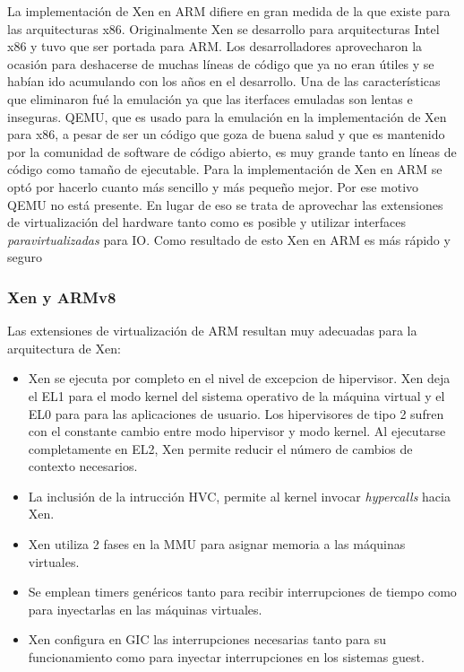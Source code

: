 La implementación de Xen en ARM difiere en gran medida de la que existe para las arquitecturas x86. Originalmente Xen se desarrollo para arquitecturas Intel x86 y tuvo que ser portada para ARM. Los desarrolladores aprovecharon la ocasión para deshacerse de muchas líneas de código que ya no eran útiles y se habían ido acumulando con los años en el desarrollo. Una de las características que eliminaron fué la emulación ya que las iterfaces emuladas son lentas e inseguras. QEMU, que es usado para la emulación en la implementación de Xen para x86, a pesar de ser un código que goza de buena salud y que es mantenido por la comunidad de software de código abierto, es muy grande tanto en líneas de código como tamaño de ejecutable. Para la implementación de Xen en ARM se optó por hacerlo cuanto más sencillo y más pequeño mejor. Por ese motivo QEMU no está presente. En lugar de eso se trata de aprovechar las extensiones de virtualización del hardware tanto como es posible y utilizar interfaces \textit{paravirtualizadas} para IO. Como resultado de esto Xen en ARM es más rápido y seguro \cite{xen_arm_whitepaper}

\subsubsection{Xen y ARMv8}

Las extensiones de virtualización de ARM resultan muy adecuadas para la arquitectura de Xen:
\begin{itemize}
  \item Xen se ejecuta por completo en el nivel de excepcion de hipervisor.  Xen deja el EL1 para el modo kernel del sistema operativo de la máquina virtual y el EL0 para para las aplicaciones de usuario. Los hipervisores de tipo 2 sufren con el constante cambio entre modo hipervisor y modo kernel. Al ejecutarse completamente en EL2, Xen permite reducir el número de cambios de contexto necesarios.
  \item La inclusión de la intrucción HVC, permite al kernel invocar \textit{hypercalls} hacia Xen.
  \item Xen utiliza 2 fases en la \acrshort{MMU} para asignar memoria a las máquinas virtuales.
  \item Se emplean timers genéricos tanto para recibir interrupciones de tiempo como para inyectarlas en las máquinas virtuales.
  \item Xen configura en GIC las interrupciones necesarias tanto para su funcionamiento como para inyectar interrupciones en los sistemas guest.
\end{itemize}

